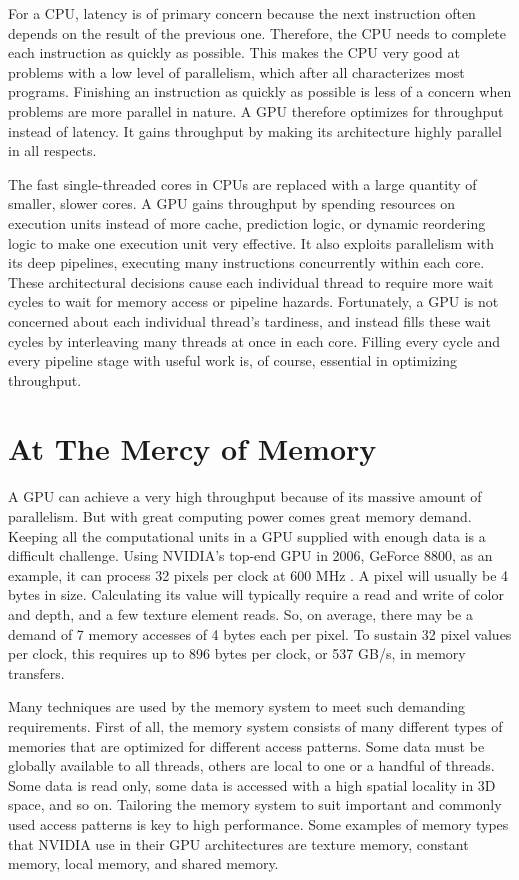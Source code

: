 \documentclass[../main/report.tex]{subfiles}
\begin{document}
For a CPU, latency is of primary concern because the next instruction often depends on the result of the previous one.
Therefore, the CPU needs to complete each instruction as quickly as possible.
This makes the CPU very good at problems with a low level of parallelism, which after all characterizes most programs.
Finishing an instruction as quickly as possible is less of a concern when problems are more parallel in nature.
A GPU therefore optimizes for throughput instead of latency.
It gains throughput by making its architecture highly parallel in all respects.

The fast single-threaded cores in CPUs are replaced with a large quantity of smaller, slower cores.
A GPU gains throughput by spending resources on execution units instead of more cache, prediction logic, or dynamic reordering logic to make one execution unit very effective.
It also exploits parallelism with its deep pipelines, executing many instructions concurrently within each core.
These architectural decisions cause each individual thread to require more wait cycles to wait for memory access or pipeline hazards.
Fortunately, a GPU is not concerned about each individual thread's tardiness, and instead fills these wait cycles by interleaving many threads at once in each core.
Filling every cycle and every pipeline stage with useful work is, of course, essential in optimizing throughput.


\section{At The Mercy of Memory}

A GPU can achieve a very high throughput because of its massive amount of parallelism.
But with great computing power comes great memory demand.
Keeping all the computational units in a GPU supplied with enough data is a difficult challenge.
Using NVIDIA's top-end GPU in 2006, GeForce 8800, as an example, it can process 32 pixels per clock at 600 MHz \cite{gpu_appendix}.
A pixel will usually be 4 bytes in size.
Calculating its value will typically require a read and write of color and depth, and a few texture element reads.
So, on average, there may be a demand of 7 memory accesses of 4 bytes each per pixel.
To sustain 32 pixel values per clock, this requires up to 896 bytes per clock, or 537 GB/s, in memory transfers.

Many techniques are used by the memory system to meet such demanding requirements.
First of all, the memory system consists of many different types of memories that are optimized for different access patterns.
Some data must be globally available to all threads, others are local to one or a handful of threads.
Some data is read only, some data is accessed with a high spatial locality in 3D space, and so on.
Tailoring the memory system to suit important and commonly used access patterns is key to high performance.
Some examples of memory types that NVIDIA use in their GPU architectures are texture memory, constant memory, local memory, and shared memory.
\end{document}
